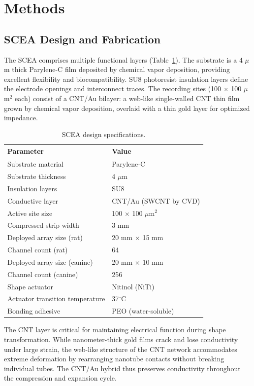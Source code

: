 \documentclass[11pt]{article}
\begin{document}
\section{Methods}

\subsection{SCEA Design and Fabrication}

The SCEA comprises multiple functional layers (Table~\ref{tab:specs}). The substrate is a 4 $\mu$m thick Parylene-C film deposited by chemical vapor deposition, providing excellent flexibility and biocompatibility. SU8 photoresist insulation layers define the electrode openings and interconnect traces. The recording sites (100 $\times$ 100 $\mu$m$^{2}$ each) consist of a CNT/Au bilayer: a web-like single-walled CNT thin film grown by chemical vapor deposition, overlaid with a thin gold layer for optimized impedance.

\begin{table}[h]
\centering
\caption{SCEA design specifications.}
\label{tab:specs}
\begin{tabular}{ll}
\toprule
Parameter & Value \\
\midrule
Substrate material & Parylene-C \\
Substrate thickness & 4 $\mu$m \\
Insulation layers & SU8 \\
Conductive layer & CNT/Au (SWCNT by CVD) \\
Active site size & 100 $\times$ 100 $\mu$m$^{2}$ \\
Compressed strip width & 3 mm \\
Deployed array size (rat) & 20 mm $\times$ 15 mm \\
Channel count (rat) & 64 \\
Deployed array size (canine) & 20 mm $\times$ 10 mm \\
Channel count (canine) & 256 \\
Shape actuator & Nitinol (NiTi) \\
Actuator transition temperature & 37$^{\circ}$C \\
Bonding adhesive & PEO (water-soluble) \\
\bottomrule
\end{tabular}
\end{table}

The CNT layer is critical for maintaining electrical function during shape transformation. While nanometer-thick gold films crack and lose conductivity under large strain, the web-like structure of the CNT network accommodates extreme deformation by rearranging nanotube contacts without breaking individual tubes. The CNT/Au hybrid thus preserves conductivity throughout the compression and expansion cycle.
\end{document}
